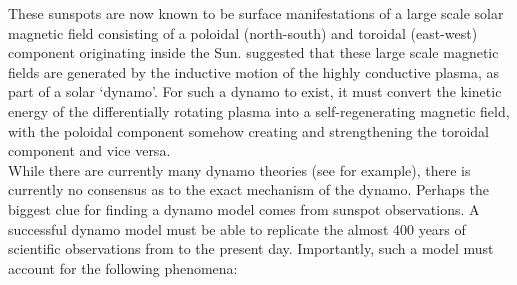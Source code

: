 \documentclass[11pt,a4paper,onecolumn]{report}
\begin{document}
These sunspots are now known to be surface manifestations of a large scale solar
magnetic field consisting of a poloidal (north-south) and toroidal (east-west)
component originating inside the Sun. \citet{JosephLarmor1919} suggested that
these large scale magnetic fields are generated by the inductive motion of the highly
conductive plasma, as part of a solar `dynamo'. For such a dynamo to exist, it
must convert the kinetic energy of the differentially rotating plasma into a
self-regenerating magnetic field, with the poloidal component somehow creating
and strengthening the toroidal component and vice versa. \\



While there are currently many dynamo theories (see
\citealt{charbonneau_dynamo_2020} for example), there is currently no consensus as
to the exact mechanism of the dynamo. Perhaps the biggest clue for finding a
dynamo model comes from sunspot observations. A successful dynamo model must be
able to replicate the almost 400 years of scientific observations from
\citet{galilei_sunspots_2010} to the present day. Importantly, such a model
must account for the following phenomena:
\end{document}
